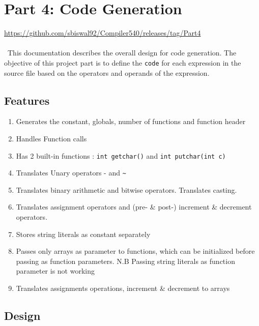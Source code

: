 \documentclass[12pt]{article}
\begin{document}
\section{Part 4: Code Generation} 

\url{https://github.com/sbiswal92/Compiler540/releases/tag/Part4}
\\~
\\~This documentation describes the overall design for code generation. The objective of this project part is to define the \texttt{code} for each expression in the source file based on the operators and operands of the expression.
  
\subsection{Features}
\label{Features}
\begin{enumerate}
\item Generates the constant, globals, number of functions and function header
\item Handles Function calls
\item Has 2 built-in functions : \texttt{int getchar()} and  \texttt{int putchar(int c)}
\item Translates Unary operators - and \texttt{\~}
\item Translates binary arithmetic and bitwise operators. Translates casting.
\item Translates assignment operators and (pre- \& post-) increment \& decrement operators.
\item Stores string literals as constant separately 
\item Passes only arrays as parameter to functions, which can be initialized before passing as function parameters. N.B Passing string literals as function parameter is not working
\item Translates assignments operations, increment \& decrement to arrays
\end{enumerate}


\subsection{Design}
\end{document}
